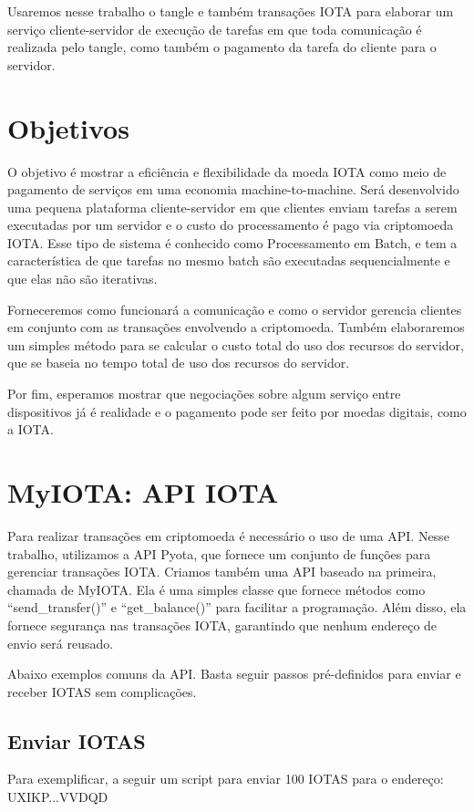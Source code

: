 \documentclass[a4paper]{article}
\begin{document}
Usaremos nesse trabalho o tangle e também transações IOTA para elaborar um serviço cliente-servidor de execução de tarefas
em que toda comunicação é realizada pelo tangle, como também o pagamento da tarefa do cliente para o servidor.

\section{Objetivos}\label{sec:Goals}

O objetivo é mostrar a eficiência e flexibilidade da moeda IOTA como meio de pagamento de serviços em uma economia
machine-to-machine. Será desenvolvido uma pequena plataforma cliente-servidor em que clientes enviam tarefas a serem
executadas por um servidor e o custo do processamento é pago via criptomoeda IOTA. Esse tipo de sistema é conhecido
como Processamento em Batch, e tem a característica de que tarefas no mesmo batch são executadas sequencialmente e que
elas não são iterativas.

Forneceremos como funcionará a comunicação e como o servidor gerencia clientes em conjunto
com as transações envolvendo a criptomoeda. Também elaboraremos um simples método para se calcular o custo total
do uso dos recursos do servidor, que se baseia no tempo total de uso dos recursos do servidor.

Por fim, esperamos mostrar que negociações sobre algum serviço entre dispositivos já é realidade e o pagamento pode ser feito
por moedas digitais, como a IOTA.

\section{MyIOTA: API IOTA}

Para realizar transações em criptomoeda é necessário o uso de uma API. Nesse trabalho, utilizamos a API Pyota, que fornece um conjunto
de funções para gerenciar transações IOTA. Criamos também uma API baseado na primeira, chamada de MyIOTA. Ela é uma simples classe
que fornece métodos como ``send\_transfer()'' e ``get\_balance()'' para facilitar a programação. Além disso, ela fornece segurança
nas transações IOTA, garantindo que nenhum endereço de envio será reusado.

Abaixo exemplos comuns da API. Basta seguir passos pré-definidos para enviar e receber IOTAS sem complicações.

\subsection{Enviar IOTAS}
Para exemplificar, a seguir um script para enviar 100 IOTAS para o endereço: UXIKP...VVDQD
\end{document}
